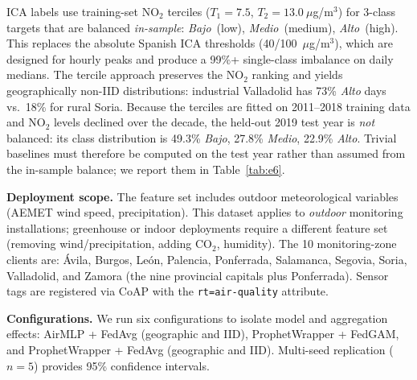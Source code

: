 \documentclass[a4paper,fleqn]{cas-dc}
\begin{document}
ICA labels use training-set NO$_2$ terciles ($T_1{=}7.5$, $T_2{=}13.0~\mu$g/m$^3$) for 3-class targets that are balanced \emph{in-sample}: \textit{Bajo}~(low), \textit{Medio}~(medium), \textit{Alto}~(high). This replaces the absolute Spanish ICA thresholds (40/100~$\mu$g/m$^3$), which are designed for hourly peaks and produce a 99\%+ single-class imbalance on daily medians. The tercile approach preserves the NO$_2$ ranking and yields geographically non-IID distributions: industrial Valladolid has 73\% \textit{Alto} days vs.\ 18\% for rural Soria. Because the terciles are fitted on 2011--2018 training data and NO$_2$ levels declined over the decade, the held-out 2019 test year is \emph{not} balanced: its class distribution is 49.3\% \textit{Bajo}, 27.8\% \textit{Medio}, 22.9\% \textit{Alto}. Trivial baselines must therefore be computed on the test year rather than assumed from the in-sample balance; we report them in Table~\ref{tab:e6}.

\textbf{Deployment scope.} The feature set includes outdoor meteorological variables (AEMET wind speed, precipitation). This dataset applies to \emph{outdoor} monitoring installations; greenhouse or indoor deployments require a different feature set (removing wind/precipitation, adding CO$_2$, humidity). The 10 monitoring-zone clients are: \'Avila, Burgos, Le\'on, Palencia, Ponferrada, Salamanca, Segovia, Soria, Valladolid, and Zamora (the nine provincial capitals plus Ponferrada). Sensor tags are registered via CoAP with the \texttt{rt=air-quality} attribute.

\textbf{Configurations.} We run six configurations to isolate model and aggregation effects: AirMLP + FedAvg (geographic and IID), ProphetWrapper + FedGAM, and ProphetWrapper + FedAvg (geographic and IID). Multi-seed replication ($n{=}5$) provides 95\% confidence intervals.
\end{document}
